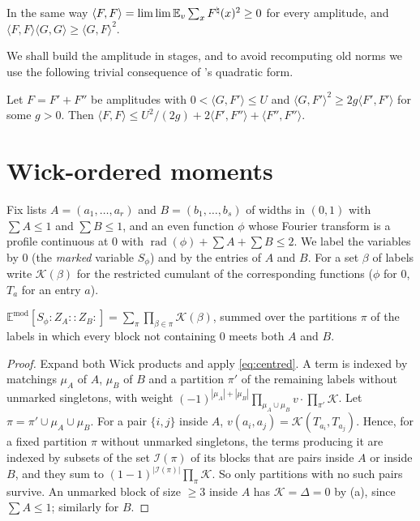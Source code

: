\documentclass[11pt,colorlinks]{charlie}
\newcommand{\rad}{\operatorname{rad}}
\newcommand{\Ka}{\mathcal{K}}
\newcommand{\Wk}[1]{{:}#1{:}}
\begin{document}
\begin{remark}
In the same way $\langle F,F\rangle=\lim\lim\mathbb{E}_v\sum_xF^\natural(x)^2\ge0$ for every amplitude, and $\langle F,F\rangle\langle G,G\rangle\ge\langle G,F\rangle^2$.
\end{remark}

We shall build the amplitude in stages, and to avoid recomputing old norms we use the following trivial consequence of 's quadratic form.

\begin{lemma}[Chaining]\label{lem:chain}
Let $F=F'+F''$ be amplitudes with $0<\langle G,F'\rangle\le U$ and $\langle G,F'\rangle^2\ge2g\langle F',F'\rangle$ for some $g>0$. Then $\langle F,F\rangle\le U^2/(2g)+2\langle F',F''\rangle+\langle F'',F''\rangle$.
\end{lemma}

\section{Wick-ordered moments}\label{sec:wick}
Fix lists $A=(a_1,\dots,a_r)$ and $B=(b_1,\dots,b_s)$ of widths in $(0,1)$ with $\sum A\le1$ and $\sum B\le1$, and an even function $\phi$ whose Fourier transform is a profile continuous at $0$ with $\rad(\phi)+\sum A+\sum B\le2$. We label the variables by $0$ (the \emph{marked} variable $S_\phi$) and by the entries of $A$ and $B$. For a set $\beta$ of labels write $\Ka(\beta)$ for the restricted cumulant of the corresponding functions ($\phi$ for $0$, $T_a$ for an entry $a$).

\begin{lemma}\label{lem:connected}
$\mathbb E^{\mathrm{mod}}[S_\phi\Wk{Z_A}\Wk{Z_B}]=\sum_\pi\prod_{\beta\in\pi}\Ka(\beta)$, summed over the partitions $\pi$ of the labels in which every block not containing $0$ meets both $A$ and $B$.
\end{lemma}
\begin{proof}
Expand both Wick products and apply \eqref{eq:centred}. A term is indexed by matchings $\mu_A$ of $A$, $\mu_B$ of $B$ and a partition $\pi'$ of the remaining labels without unmarked singletons, with weight $(-1)^{|\mu_A|+|\mu_B|}\prod_{\mu_A\cup\mu_B}v\cdot\prod_{\pi'}\Ka$. Let $\pi=\pi'\cup\mu_A\cup\mu_B$. For a pair $\{i,j\}$ inside $A$, $v(a_i,a_j)=\Ka(T_{a_i},T_{a_j})$. Hence, for a fixed partition $\pi$ without unmarked singletons, the terms producing it are indexed by subsets of the set $\mathcal I(\pi)$ of its blocks that are pairs inside $A$ or inside $B$, and they sum to $(1-1)^{|\mathcal I(\pi)|}\prod_\pi\Ka$. So only partitions with no such pairs survive. An unmarked block of size $\ge3$ inside $A$ has $\Ka=\Delta=0$ by (a), since $\sum A\le1$; similarly for $B$.
\end{proof}
\end{document}
